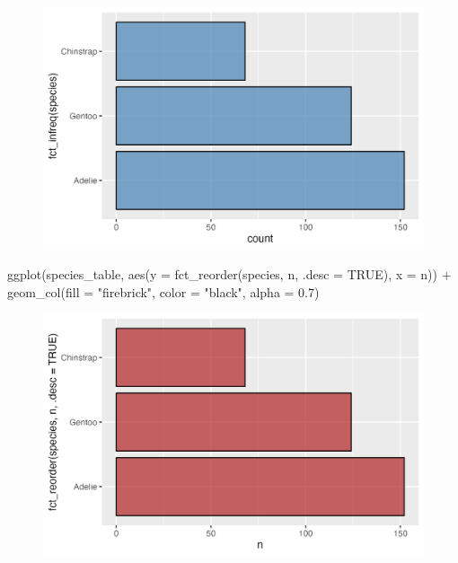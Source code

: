 \documentclass[
  letterpaper,
  DIV=11,
  numbers=noendperiod]{scrreprt}
\newenvironment{Shaded}{\begin{snugshade}}{\end{snugshade}}
\newcommand{\AttributeTok}[1]{\textcolor[rgb]{0.40,0.45,0.13}{#1}}
\newcommand{\ConstantTok}[1]{\textcolor[rgb]{0.56,0.35,0.01}{#1}}
\newcommand{\FloatTok}[1]{\textcolor[rgb]{0.68,0.00,0.00}{#1}}
\newcommand{\FunctionTok}[1]{\textcolor[rgb]{0.28,0.35,0.67}{#1}}
\newcommand{\NormalTok}[1]{\textcolor[rgb]{0.00,0.23,0.31}{#1}}
\newcommand{\SpecialCharTok}[1]{\textcolor[rgb]{0.37,0.37,0.37}{#1}}
\newcommand{\StringTok}[1]{\textcolor[rgb]{0.13,0.47,0.30}{#1}}
\begin{document}
\begin{figure}[H]

{\centering \includegraphics{./03-visualization_files/figure-pdf/unnamed-chunk-44-1.png}

}

\end{figure}

\begin{Shaded}
\begin{Highlighting}[]
\FunctionTok{ggplot}\NormalTok{(species\_table, }
       \FunctionTok{aes}\NormalTok{(}\AttributeTok{y =} \FunctionTok{fct\_reorder}\NormalTok{(species, n, }\AttributeTok{.desc =} \ConstantTok{TRUE}\NormalTok{), }\AttributeTok{x =}\NormalTok{ n)) }\SpecialCharTok{+}
  \FunctionTok{geom\_col}\NormalTok{(}\AttributeTok{fill =} \StringTok{"firebrick"}\NormalTok{, }\AttributeTok{color =} \StringTok{"black"}\NormalTok{, }\AttributeTok{alpha =} \FloatTok{0.7}\NormalTok{)}
\end{Highlighting}
\end{Shaded}

\begin{figure}[H]

{\centering \includegraphics{./03-visualization_files/figure-pdf/unnamed-chunk-44-2.png}

}

\end{figure}
\end{document}
